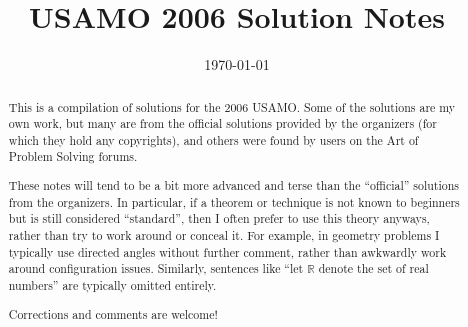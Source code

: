 \documentclass[11pt]{scrartcl}
\title{USAMO 2006 Solution Notes}
\date{\today}
\begin{document}
\maketitle

\begin{abstract}
This is a compilation of solutions
for the 2006 USAMO.
Some of the solutions are my own work,
but many are from the official solutions provided by the organizers
(for which they hold any copyrights),
and others were found by users on the Art of Problem Solving forums.

These notes will tend to be a bit more advanced and terse than the ``official''
solutions from the organizers.
In particular, if a theorem or technique is not known to beginners
but is still considered ``standard'', then I often prefer to
use this theory anyways, rather than try to work around or conceal it.
For example, in geometry problems I typically use directed angles
without further comment, rather than awkwardly work around configuration issues.
Similarly, sentences like ``let $\mathbb{R}$ denote the set of real numbers''
are typically omitted entirely.

Corrections and comments are welcome!
\end{abstract}

\tableofcontents
\newpage

\addtocounter{section}{-1}
\end{document}
